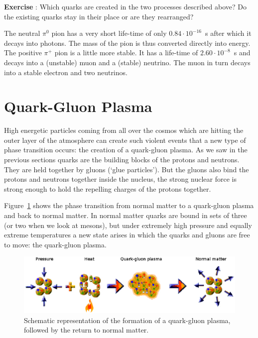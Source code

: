 \documentclass[12pt,a4paper]{article}
\numberwithin{equation}{section}
\numberwithin{figure}{section}
\newcounter{Exercise}
\numberwithin{table}{section}
\begin{document}
\begin{shaded}
\textbf{Exercise \theExercise {}} : Which quarks are created in the two processes described above? Do the existing quarks stay in their place or are they rearranged? \end{shaded}

The neutral $\pi^0$ pion has a very short life-time of only $0.84 \cdot 10^{-16}$~s after which it decays into photons. The mass of the pion is thus converted directly into energy. The positive $\pi^+$ pion is a little more stable. It has a life-time of $2.60 \cdot 10^{-8}$~s and decays into a (unstable) muon and a (stable) neutrino. The muon in turn decays into a stable electron and two neutrinos.

\section{Quark-Gluon Plasma}
High energetic particles coming from all over the cosmos which are hitting the outer layer of the atmosphere can create such violent events that a new type of phase transition occurs: the creation of a quark-gluon plasma. As we saw in the previous sections quarks are the building blocks of the protons and neutrons. They are held together by gluons (`glue particles'). But the gluons also bind the protons and neutrons together inside the nucleus, the strong nuclear force is strong enough to hold the repelling charges of the protons together.

Figure~\ref{fig:quark_gluon} shows the phase transition from normal matter to a quark-gluon plasma and back to normal matter. In normal matter quarks are bound in sets of three (or two when we look at mesons), but under extremely high pressure and equally extreme temperatures a new state arises in which the quarks and gluons are free to move: the quark-gluon plasma.

\begin{figure}\begin{center}
\includegraphics[scale=0.6]{quark_gluon.eps}%
\caption{Schematic representation of the formation of a quark-gluon plasma, followed by the return to normal matter.}\label{fig:quark_gluon}
\end{center}\end{figure}
\end{document}
